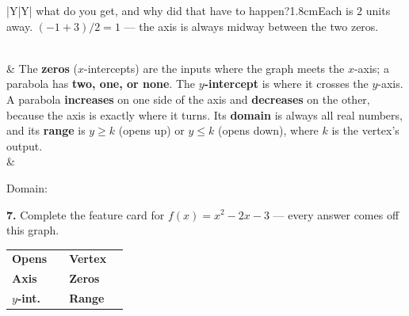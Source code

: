 \documentclass[12pt]{article}
\newcommand{\lgrid}[4]{%
  \draw[step=1, linegray!40, very thin] (#1,#3) grid (#2,#4);
  \draw[->, semithick, charcoal] (#1,0)--(#2,0) node[below right, font=\tiny]{$x$};
  \draw[->, semithick, charcoal] (0,#3)--(0,#4) node[left, font=\tiny]{$y$};}
\newcommand{\fdot}[3]{\fill[#1] (#2,#3) circle (3.0pt);}
\begin{document}
\begin{guidednotes}
\begin{probgrid}{|Y|Y|}
{what do you get, and why did that have to happen?}{1.8cm}{Each is $2$ units away. $(-1+3)/2=1$ --- the axis is always midway between the two zeros.} \\ \hline
\end{probgrid}
\\ \hline
 &
The \textbf{zeros} ($x$-intercepts) are the inputs where the graph meets the $x$-axis; a parabola
has \textbf{two, one, or none}. The \textbf{$y$-intercept} is where it crosses the $y$-axis. A
parabola \textbf{increases} on one side of the axis and \textbf{decreases} on the other, because
the axis is exactly where it turns. Its \textbf{domain} is always all real numbers, and its
\textbf{range} is $y\ge k$ (opens up) or $y\le k$ (opens down), where $k$ is the vertex's output.
\\
& \begin{minipage}[c]{0.38\linewidth}\centering
{}\par\vspace{2pt}
Domain: 
\end{minipage}\hfill
\begin{minipage}[c]{0.58\linewidth}
\textbf{7.} Complete the feature card for $f(x)=x^2-2x-3$ --- every answer comes off this graph.
\par\vspace{3pt}
\renewcommand{\arraystretch}{1.3}
\begin{tabularx}{\linewidth}{@{} >{\bfseries}l Y >{\bfseries}l Y @{}}
Opens &  & Vertex &  \\
Axis &  & Zeros &  \\
$y$-int. &  & Range &  \\

\end{tabularx}
\end{minipage}
\end{guidednotes}
\end{document}
